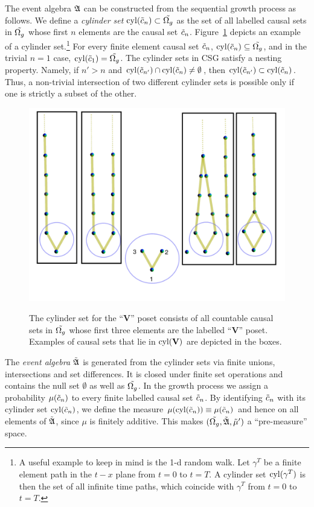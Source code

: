 The event algebra $\mathfrak A$ can be constructed from the sequential growth process as follows.  
 We define  a \emph{cylinder set}  $\mathrm{cyl}(\tilde c_n) \subset \tilde {\Omega_g}$ as
the set of all labelled causal sets in $\tilde {\Omega_g}$ whose first $n$ elements are the causal set
$\tilde c_n$. Figure~\ref{cylinder.fig} depicts an example of a cylinder set.\footnote{A useful example to keep in mind is the 1-d random walk. Let $\gamma^T$ be a finite element path in the $t-x$ plane from $t=0$
to $t=T$.  A cylinder set $\mathrm{cyl}(\gamma^T)$ is then the set of all infinite time paths, which coincide with $\gamma^T$
from $t=0$ to $t=T$.}   For every finite
element causal set $\tilde c_n$,  $\mathrm{cyl}(\tilde c_n) \subseteq  \tilde {\Omega_g}$, and in the trivial $n=1$ case, $\mathrm{cyl}(\tilde c_1)=\tilde {\Omega_g}$.   The cylinder
sets in CSG satisfy a nesting property. Namely, if $n'>n$ and $\mathrm{cyl}(\tilde c_{n'})\cap \mathrm{cyl}(\tilde c_n)
\neq \emptyset$, then $\mathrm{cyl}(\tilde c_{n'})\subset  \mathrm{cyl}(\tilde c_n)$. Thus, a non-trivial intersection of two different cylinder sets is 
possible only if one is strictly a subset of the other.

\begin{figure}[ht]
  \centering \resizebox{4in}{!} {\includegraphics[width=\textwidth]{cylinderset}} 
  \caption{The cylinder set for the ``{\bf V}'' poset consists of all countable causal sets
      in $\tilde {\Omega_g}$ whose first three elements are the labelled ``{\bf V}'' poset. Examples of causal sets that lie in $\mathrm{cyl}(\mathbf{V})$
      are depicted in the boxes.}
\label{cylinder.fig}
\end{figure}


The \emph{event algebra $\tilde {\mathfrak A}$} is generated from the cylinder  sets via
finite unions,  intersections and set differences. It is closed under finite set operations and
contains the null set $\emptyset$ as well as $\tilde {\Omega_g}$. In the growth process we assign a probability $\mu(\tilde c_n)$ to every finite
labelled causal set $\tilde c_n$. By identifying $\tilde c_n$ with its cylinder set $\mathrm{cyl}(\tilde c_n)$, we define the measure 
$\mu(\mathrm{cyl}(\tilde c_n))\equiv \mu(\tilde c_n)$ and hence on all elements of $\tilde {\mathfrak A}$, since $\mu$ is finitely additive.   This makes 
$(\tilde {\Omega_g}, \tilde {\mathfrak A}, \tilde \mu')$ a ``pre-measure''  space.  

